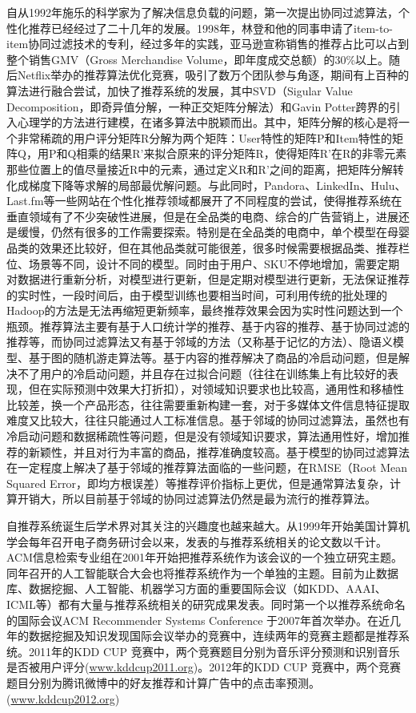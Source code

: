 	自从1992年施乐的科学家为了解决信息负载的问题，第一次提出协同过滤算法，个性化推荐已经经过了二十几年的发展。1998年，林登和他的同事申请了item-to-item协同过滤技术的专利，经过多年的实践，亚马逊宣称销售的推荐占比可以占到整个销售GMV（Gross Merchandise Volume，即年度成交总额）的30\%以上。随后Netflix举办的推荐算法优化竞赛，吸引了数万个团队参与角逐，期间有上百种的算法进行融合尝试，加快了推荐系统的发展，其中SVD（Sigular Value Decomposition，即奇异值分解，一种正交矩阵分解法）和Gavin Potter跨界的引入心理学的方法进行建模，在诸多算法中脱颖而出。其中，矩阵分解的核心是将一个非常稀疏的用户评分矩阵R分解为两个矩阵：User特性的矩阵P和Item特性的矩阵Q，用P和Q相乘的结果R'来拟合原来的评分矩阵R，使得矩阵R'在R的非零元素那些位置上的值尽量接近R中的元素，通过定义R和R'之间的距离，把矩阵分解转化成梯度下降等求解的局部最优解问题。与此同时，Pandora、LinkedIn、Hulu、Last.fm等一些网站在个性化推荐领域都展开了不同程度的尝试，使得推荐系统在垂直领域有了不少突破性进展，但是在全品类的电商、综合的广告营销上，进展还是缓慢，仍然有很多的工作需要探索。特别是在全品类的电商中，单个模型在母婴品类的效果还比较好，但在其他品类就可能很差，很多时候需要根据品类、推荐栏位、场景等不同，设计不同的模型。同时由于用户、SKU不停地增加，需要定期对数据进行重新分析，对模型进行更新，但是定期对模型进行更新，无法保证推荐的实时性，一段时间后，由于模型训练也要相当时间，可利用传统的批处理的Hadoop的方法是无法再缩短更新频率，最终推荐效果会因为实时性问题达到一个瓶颈。推荐算法主要有基于人口统计学的推荐、基于内容的推荐、基于协同过滤的推荐等，而协同过滤算法又有基于邻域的方法（又称基于记忆的方法）、隐语义模型、基于图的随机游走算法等。基于内容的推荐解决了商品的冷启动问题，但是解决不了用户的冷启动问题，并且存在过拟合问题（往往在训练集上有比较好的表现，但在实际预测中效果大打折扣），对领域知识要求也比较高，通用性和移植性比较差，换一个产品形态，往往需要重新构建一套，对于多媒体文件信息特征提取难度又比较大，往往只能通过人工标准信息。基于邻域的协同过滤算法，虽然也有冷启动问题和数据稀疏性等问题，但是没有领域知识要求，算法通用性好，增加推荐的新颖性，并且对行为丰富的商品，推荐准确度较高。基于模型的协同过滤算法在一定程度上解决了基于邻域的推荐算法面临的一些问题，在RMSE（Root Mean Squared Error，即均方根误差）等推荐评价指标上更优，但是通常算法复杂，计算开销大，所以目前基于邻域的协同过滤算法仍然是最为流行的推荐算法。

	自推荐系统诞生后学术界对其关注的兴趣度也越来越大。从1999年开始美国计算机学会每年召开电子商务研讨会以来，发表的与推荐系统相关的论文数以千计。ACM信息检索专业组在2001年开始把推荐系统作为该会议的一个独立研究主题。同年召开的人工智能联合大会也将推荐系统作为一个单独的主题。目前为止数据库、数据挖掘、人工智能、机器学习方面的重要国际会议（如KDD、AAAI、ICML等）都有大量与推荐系统相关的研究成果发表。同时第一个以推荐系统命名的国际会议ACM Recommender Systems Conference 于2007年首次举办。在近几年的数据挖掘及知识发现国际会议举办的竞赛中，连续两年的竞赛主题都是推荐系统。2011年的KDD CUP 竞赛中，两个竞赛题目分别为音乐评分预测和识别音乐是否被用户评分(\href{http://www.kdd.org/kdd2011/kddcup.shtml}{www.kddcup2011.org})。2012年的KDD CUP 竞赛中，两个竞赛题目分别为腾讯微博中的好友推荐和计算广告中的点击率预测。(\href{www.kddcup2012.org}{www.kddcup2012.org})

